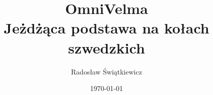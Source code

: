 \documentclass[a4paper]{report}
\begin{document}
\title{OmniVelma\\Jeżdżąca podstawa na kołach szwedzkich}
\author{Radosław Świątkiewicz}
\date{\today}
\maketitle

\tableofcontents


\end{document}
